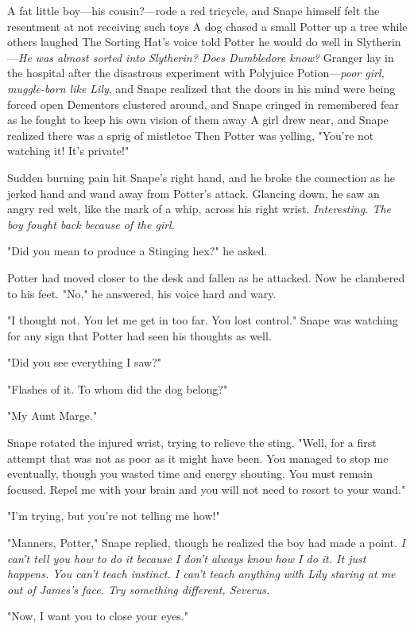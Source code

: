 A fat little boy—his cousin?—rode a red tricycle, and Snape himself felt the resentment at not receiving such toys{\el} A dog chased a small Potter up a tree while others laughed{\el} The Sorting Hat's voice told Potter he would do well in Slytherin—\emph{He was almost sorted into Slytherin? Does Dumbledore know?}{\el} Granger lay in the hospital after the disastrous experiment with Polyjuice Potion—\emph{poor girl, muggle-born like Lily}, and Snape realized that the doors in his mind were being forced open{\el} Dementors clustered around, and Snape cringed in remembered fear as he fought to keep his own vision of them away{\el} A girl drew near, and Snape realized there was a sprig of mistletoe{\el} Then Potter was yelling, "You're not watching it! It's private!"

Sudden burning pain hit Snape's right hand, and he broke the connection as he jerked hand and wand away from Potter's attack. Glancing down, he saw an angry red welt, like the mark of a whip, across his right wrist. \emph{Interesting. The boy fought back because of the girl.}

"Did you mean to produce a Stinging hex?" he asked.

Potter had moved closer to the desk and fallen as he attacked. Now he clambered to his feet. "No," he answered, his voice hard and wary.

"I thought not. You let me get in too far. You lost control." Snape was watching for any sign that Potter had seen his thoughts as well.

"Did you see everything I saw?"

"Flashes of it. To whom did the dog belong?"

"My Aunt Marge."

Snape rotated the injured wrist, trying to relieve the sting. "Well, for a first attempt that was not as poor as it might have been. You managed to stop me eventually, though you wasted time and energy shouting. You must remain focused. Repel me with your brain and you will not need to resort to your wand."

"I'm trying, but you're not telling me how!"

"Manners, Potter," Snape replied, though he realized the boy had made a point. \emph{I can't tell you how to do it because I don't always know how I do it. It just happens. You can't teach instinct. I can't teach anything with Lily staring at me out of James's face. Try something different, Severus.}

"Now, I want you to close your eyes."

